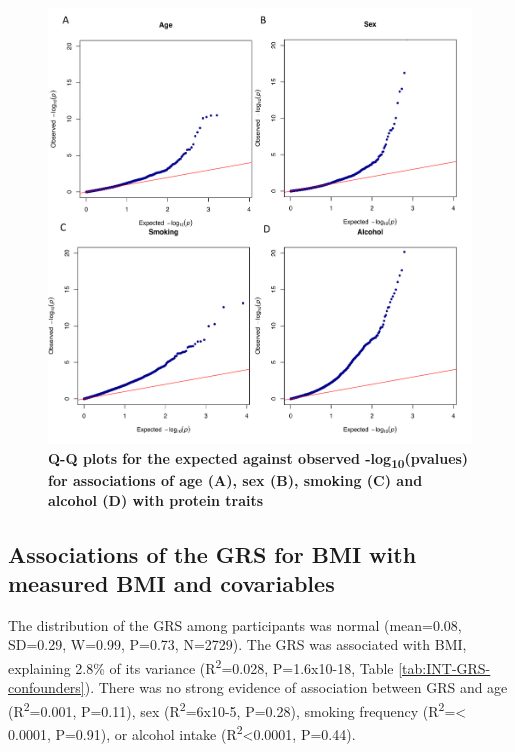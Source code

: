 \documentclass[11pt,twoside]{bristolthesis}
\begin{document}
\begin{figure}

{\centering \includegraphics[width=0.95\linewidth]{figure/BMI_protein_INTERVAL/QQ_confounder_proteins} 

}

\caption[Q-Q plots of the expected against observed -log\textsubscript{10}(pvalues) for the associations between covariables and protein traits]{\textbf{Q-Q plots for the expected against observed -log\textsubscript{10}(pvalues) for associations of age (A), sex (B), smoking (C) and alcohol (D) with protein traits}}\label{fig:QQ-confounder-proteins}
\end{figure}
\hypertarget{associations-of-the-grs-for-bmi-with-measured-bmi-and-covariables}{%
\subsection{Associations of the GRS for BMI with measured BMI and covariables}\label{associations-of-the-grs-for-bmi-with-measured-bmi-and-covariables}}

The distribution of the GRS among participants was normal (mean=0.08, SD=0.29, W=0.99, P=0.73, N=2729). The GRS was associated with BMI, explaining 2.8\% of its variance (R\textsuperscript{2}=0.028, P=1.6x10-18, Table \ref{tab:INT-GRS-confounders}). There was no strong evidence of association between GRS and age (R\textsuperscript{2}=0.001, P=0.11), sex (R\textsuperscript{2}=6x10-5, P=0.28), smoking frequency (R\textsuperscript{2}=\textless{} 0.0001, P=0.91), or alcohol intake (R\textsuperscript{2}\textless0.0001, P=0.44).
\end{document}
